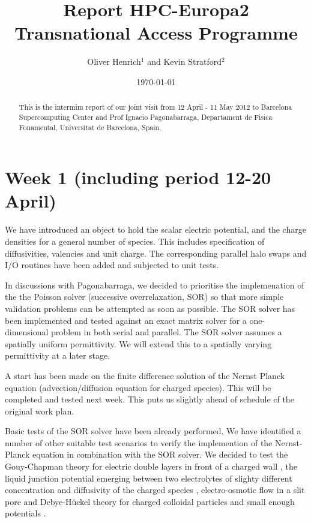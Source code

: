 \documentclass[aps,pre,preprint,groupedaddress]{revtex4-1}
\begin{document}
\title{Report HPC-Europa2 Transnational Access Programme}

\author{Oliver Henrich$^1$ and Kevin Stratford$^2$}



\date{\today}
\begin{abstract}
This is the intermim report of our joint visit from 12 April - 11 May 2012 to Barcelona Supercomputing Center and Prof Ignacio Pagonabarraga, Departament de Fisica Fonamental, Universitat de Barcelona, Spain.
\end{abstract}


\maketitle

\section{Week 1 (including period 12-20 April)}

We have introduced an object to hold the scalar electric potential,
and the charge densities for a general number of species. This
includes specification of diffusivities, valencies and unit charge.
The corresponding parallel halo swaps and I/O routines have been
added and subjected to unit tests.

In discussions with Pagonabarraga, we decided to prioritise the
implemenation of the the Poisson solver (successive overrelaxation,
SOR) so that more simple validation problems can be attempted as
soon as possible. The SOR solver has been implemented and tested
against an exact matrix solver for a one-dimensional problem in
both serial and parallel. The SOR solver assumes a spatially
uniform permittivity. We will extend this to a spatially varying
permittivity at a later stage.

A start has been made on the finite difference solution of the
Nernst Planck equation (advection/diffusion equation for charged
species). This will be completed and tested next week. This puts
us slightly ahead of schedule cf the original work plan.

Basic tests of the SOR solver have been already performed.
We have identified a number of other suitable test scenarios to 
verify the implemention of the Nernst-Planck equation in 
combination with the SOR solver.
We decided to test the Gouy-Chapman theory
for electric double layers in front of a charged wall \cite{Lyklema},
the liquid junction potential emerging between two electrolytes
of slighty different concentration and diffusivity of the charged species \cite{Mafe},
electro-osmotic flow in a slit pore  
\cite{Capuani, Rotenberg} and Debye-H\"uckel theory for charged 
colloidal particles and small enough potentials \cite{Lyklema}.
\end{document}
